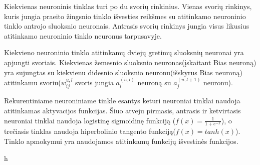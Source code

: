 Kiekvienas neuroninis tinklas turi po du svorių rinkinius. Vienas svorių rinkinys, kuris jungia praeito žingsnio tinklo išvesties reikšmes su atitinkamo neuroninio tinklo antrojo sluoksnio neuronais. Antrasis svorių rinkinys jungia visus likusius atitinkamo neuroninio tinklo neuronus tarpusavyje.

Kiekvieno neuroninio tinklo atitinkamų dviejų gretimų sluoksnių neuronai yra apjungti svoriais. Kiekvienas žemesnio sluoksnio neuronas(įskaitant Bias neuroną) yra sujungtas su kiekvienu didesnio sluoksnio neuronu(išskyrus Bias neuroną) atitinkamu svoriu(\begin{math}w_{ij}^{u,l}\end{math} svoris jungia \begin{math}a_i^{(u,l)}\end{math} neuroną su \begin{math}a_j^{(u,l+1)}\end{math} neuronu).

Rekurentiniame neuroniniame tinkle esantys keturi neuroniai tinklai naudoja atitinkamas aktyvacijos funkcijas. Šiuo atveju pirmasis, antrasis ir ketvirtasis neuroniai tinklai naudoja logistinę sigmoidinę funkciją (\begin{math}f(x) = \frac{1}{1+e^{-x}}\end{math}), o trečiasis tinklas naudoja hiperbolinio tangento funkciją(\begin{math}f(x) = tanh(x)\end{math}). Tinklo apmokymui yra naudojamos atitinkamų funkcijų išvestinės funkcijos.

h

